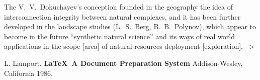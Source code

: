 \documentclass[12pt,leqno]{book}
\begin{document}
The V.~V.~Dokuchayev's conception founded in the geography the idea of interconnection integrity between natural complexes, and it has been further developed in the landscape studies (L.~S.~Berg, B.~B.~Polynov), which appear to become in the future ``synthetic natural science'' and its ways of real world applications in the scope [area] of natural resources deployment [exploration]. -->





\pagestyle{headings}




\begin{thebibliography}{99}
 L. Lamport. {\bf \LaTeX \ A Document Preparation System}
Addison-Wesley, California 1986.
\end{thebibliography}
\listoffigures
\listoftables

\end{document}
